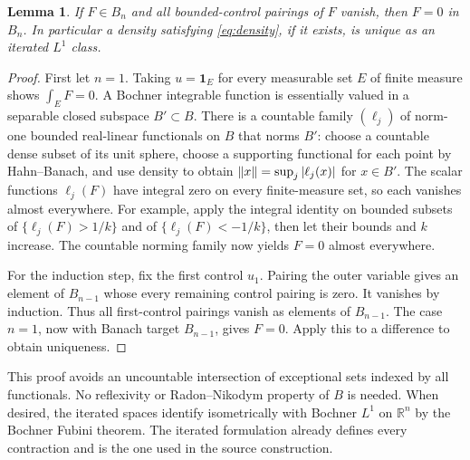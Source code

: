 \documentclass[11pt]{article}
\newtheorem{lemma}[theorem]{Lemma}
\theoremstyle{remark}\newtheorem{remark}[theorem]{Remark}
\newcommand{\R}{\mathbb R}\newcommand{\C}{\mathbb C}
\begin{document}
\begin{lemma}\label{lem:separate}
If $F\in B_n$ and all bounded-control pairings of $F$ vanish, then $F=0$ in $B_n$. In particular a density satisfying \eqref{eq:density}, if it exists, is unique as an iterated $L^1$ class.
\end{lemma}
\begin{proof}
First let $n=1$. Taking $u=\mathbf1_E$ for every measurable set $E$ of finite measure shows $\int_E F=0$. A Bochner integrable function is essentially valued in a separable closed subspace $B'\subset B$. There is a countable family $(\ell_j)$ of norm-one bounded real-linear functionals on $B$ that norms $B'$: choose a countable dense subset of its unit sphere, choose a supporting functional for each point by Hahn--Banach, and use density to obtain $\left\lVert x\right\rVert=\sup_j|\ell_j(x)|$ for $x\in B'$. The scalar functions $\ell_j(F)$ have integral zero on every finite-measure set, so each vanishes almost everywhere. For example, apply the integral identity on bounded subsets of $\{\ell_j(F)>1/k\}$ and of $\{\ell_j(F)<-1/k\}$, then let their bounds and $k$ increase. The countable norming family now yields $F=0$ almost everywhere.

For the induction step, fix the first control $u_1$. Pairing the outer variable gives an element of $B_{n-1}$ whose every remaining control pairing is zero. It vanishes by induction. Thus all first-control pairings vanish as elements of $B_{n-1}$. The case $n=1$, now with Banach target $B_{n-1}$, gives $F=0$. Apply this to a difference to obtain uniqueness.
\end{proof}

This proof avoids an uncountable intersection of exceptional sets indexed by all functionals. No reflexivity or Radon--Nikodym property of $B$ is needed. When desired, the iterated spaces identify isometrically with Bochner $L^1$ on $\R^n$ by the Bochner Fubini theorem. The iterated formulation already defines every contraction and is the one used in the source construction.
\end{document}
